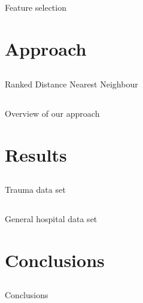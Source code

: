 \documentclass[compress]{beamer}
\begin{document}
\subsection{}
\begin{frame}{Feature selection}
\end{frame}

\section{Approach}
\subsection{}
\begin{frame}{Ranked Distance Nearest Neighbour}
\end{frame}

\subsection{}
\begin{frame}{Overview of our approach}
\end{frame}

\section{Results}
\subsection{}
\begin{frame}{Trauma data set}
\end{frame}

\subsection{}
\begin{frame}{General hospital data set}
\end{frame}

\section{Conclusions}
\subsection{}
\begin{frame}{Conclusions}
\end{frame}
\end{document}

